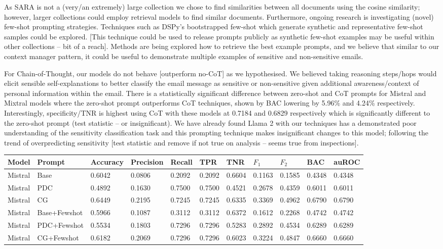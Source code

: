 As SARA is not a (very/an extremely) large collection we chose to find similarities between all documents using the cosine similarity; however, larger collections could employ retrieval models to find similar documents. Furthermore, ongoing research is investigating (novel) few-shot prompting strategies. Techniques such as DSPy’s bootstrapped few-shot which generate synthetic and representative few-shot samples could be explored. [This technique could be used to release prompts publicly as synthetic few-shot examples may be useful within other collections – bit of a reach]. Methods are being explored how to retrieve the best example prompts, and we believe that similar to our context manager pattern, it could be useful to demonstrate multiple examples of sensitive and non-sensitive emails.

For Chain-of-Thought, our models do not behave [outperform no-CoT] as we hypothesised. We believed taking reasoning steps/hops would elicit sensible self-explanations to better classify the email message as sensitive or non-sensitive given additional awareness/context of personal information within the email. There is a statistically significant difference between zero-shot and CoT prompts for Mistral and Mixtral models where the zero-shot prompt outperforms CoT techniques, shown by BAC lowering by 5.96\% and 4.24\% respectively. Interestingly, specificity/TNR is highest using CoT with these models at 0.7184 and 0.6829 respectively which is significantly different to the zero-shot prompt (test statistic – or insignificant). We have already found Llama 2 with our techniques has a demonstrated poor understanding of the sensitivity classification task and this prompting technique makes insignificant changes to this model; following the trend of overpredicting sensitivity [test statistic and remove if not true on analysis – seems true from inspections].


\begin{table*}[]
\begin{tabular}{@{}lllllllllll@{}}
\toprule
Model & Prompt & Accuracy & Precision & Recall & TPR & TNR & $F_{1}$ & $F_{2}$ & BAC & auROC \\ \midrule
Mistral & Base & 0.6042 & 0.0806 & 0.2092 & 0.2092 & 0.6604 & 0.1163 & 0.1585 & 0.4348 & 0.4348 \\
Mistral & PDC & 0.4892 & 0.1630 & 0.7500 & 0.7500 & 0.4521 & 0.2678 & 0.4359 & 0.6011 & 0.6011 \\
Mistral & CG & 0.6449 & 0.2195 & 0.7245 & 0.7245 & 0.6335 & 0.3369 & 0.4962 & 0.6790 & 0.6790 \\
Mistral & Base+Fewshot & 0.5966 & 0.1087 & 0.3112 & 0.3112 & 0.6372 & 0.1612 & 0.2268 & 0.4742 & 0.4742 \\
Mistral & PDC+Fewshot & 0.5534 & 0.1803 & 0.7296 & 0.7296 & 0.5283 & 0.2892 & 0.4534 & 0.6289 & 0.6289 \\
Mistral & CG+Fewshot & 0.6182 & 0.2069 & 0.7296 & 0.7296 & 0.6023 & 0.3224 & 0.4847 & 0.6660 & 0.6660 \\ \bottomrule
\end{tabular}
\end{table*}



